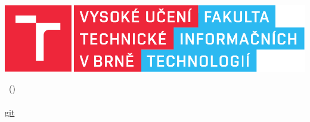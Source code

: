 \includegraphics{FIT.pdf}

\begin{center}
	\LARGE
	\courseName\ (\courseShortcut)\\
	\Huge
		\projectName\\
	\normalsize
	\url{git}
\end{center}




\newpage
{}
\tableofcontents
\newpage


